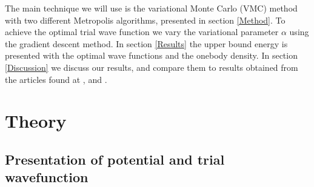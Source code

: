\documentclass[norsk,a4paper,12pt]{article}
\begin{document}
The main technique we will use is the variational Monte Carlo (VMC) method with two different Metropolis algorithms, presented in section \ref{Method}. To achieve the optimal trial wave function we vary the variational parameter $\alpha$ using the gradient descent method. In section \ref{Results} the upper bound energy is presented with the optimal wave functions and the onebody density. In section \ref{Discussion} we discuss our results, and compare them to results obtained from the articles found at \cite{DuBois}, \cite{Nilsen} and \cite{Dalfovo}.


\section{Theory} \label{Theory}

\subsection{Presentation of potential and trial wavefunction} 
\end{document}
